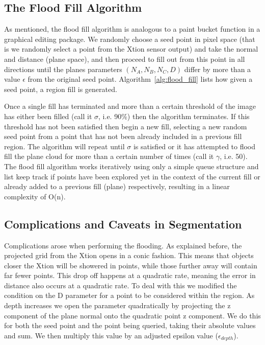 \documentclass[]{article}
\begin{document}
{\subsection{The Flood Fill Algorithm}
As mentioned, the flood fill algorithm is analogous to a paint bucket function in a graphical editing package. We randomly choose a seed point in pixel space (that is we randomly select a point from the Xtion sensor output) and take the normal and distance (plane space), and then proceed to fill out from this point in all directions until the planes parameters $(N_A, N_B, N_C, D)$ differ by more than a value $\epsilon$ from the original seed point. Algorithm~\ref{alg:flood_fill} lists how given a seed point, a region fill is generated.

Once a single fill has terminated and more than a certain threshold of the image has either been filled (call it $\sigma$, i.e. 90\%) then the algorithm terminates. If this threshold has not been satisfied then begin a new fill, selecting a new random seed point from a point that has not been already included in a previous fill region. The algorithm will repeat until $\sigma$ is satisfied or it has attempted to flood fill the plane cloud for more than a certain number of times (call it $\gamma$, i.e. 50). The flood fill algorithm works iteratively using only a simple queue structure and list keep track if points have been explored yet in the context of the current fill or already added to a previous fill (plane) respectively, resulting in a linear complexity of O(n). 


\subsection{Complications and Caveats in Segmentation} %
\label{sub:complications_in_the_segmentation_algorithm}


Complications arose when performing the flooding. As explained before, the projected grid from the Xtion opens in a conic fashion. This means that objects closer the Xtion will be showered in points, while those further away will contain far fewer points. This drop off happens at a quadratic rate, meaning the error in distance also occurs at a quadratic rate. To deal with this we modified the condition on the D parameter for a point to be considered within the region. As depth increases we open the parameter quadratically by projecting the z component of the plane normal onto the quadratic point z component. We do this for both the seed point and the point being queried, taking their absolute values and sum. We then multiply this value by an adjusted epsilon value ($\epsilon_{depth}$). 


}
\end{document}

